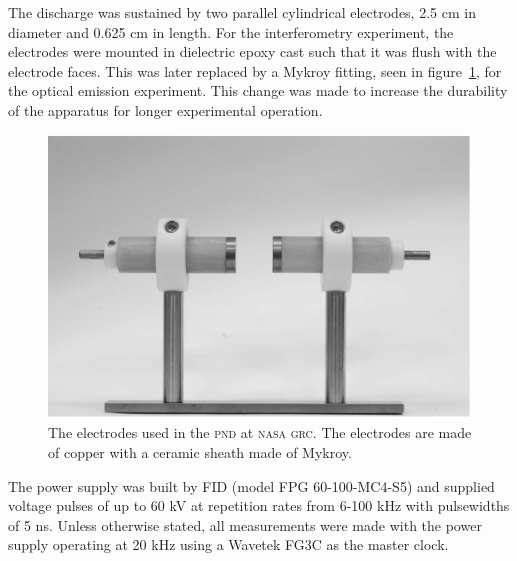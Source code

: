 The discharge was sustained by two parallel cylindrical electrodes, 2.5 cm in
diameter and 0.625 cm in length. For the interferometry experiment, the
electrodes were mounted in dielectric epoxy cast such that it was flush with the
electrode faces. This was later replaced by a Mykroy fitting, seen in
figure~\ref{fig:electrodes}, for the optical emission experiment. This change
was made to increase the durability of the apparatus for longer experimental
operation.
\begin{figure}
  \centering
  \includegraphics{./chapters/nasa/figures/electrodes.pdf}
  \caption{The electrodes used in the \textsc{pnd} at \textsc{nasa grc}. The
    electrodes are made of copper with a ceramic sheath made of
    Mykroy.}
  \label{fig:electrodes}
\end{figure}
The power supply was built by FID (model FPG 60-100-MC4-S5) and supplied voltage
pulses of up to 60 kV at repetition rates from 6-100 kHz with pulsewidths of 5
ns. Unless otherwise stated, all measurements were made with the power supply
operating at 20 kHz using a Wavetek FG3C as the master clock.
